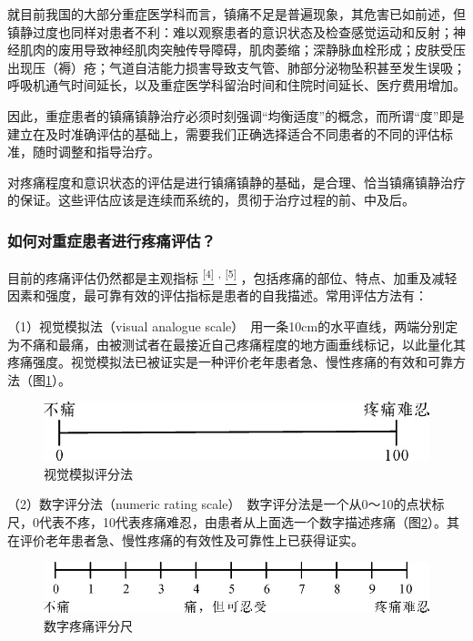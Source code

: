 就目前我国的大部分重症医学科而言，镇痛不足是普遍现象，其危害已如前述，但镇静过度也同样对患者不利：难以观察患者的意识状态及检查感觉运动和反射；神经肌肉的废用导致神经肌肉突触传导障碍，肌肉萎缩；深静脉血栓形成；皮肤受压出现压（褥）疮；气道自洁能力损害导致支气管、肺部分泌物坠积甚至发生误吸；呼吸机通气时间延长，以及重症医学科留治时间和住院时间延长、医疗费用增加。

因此，重症患者的镇痛镇静治疗必须时刻强调“均衡适度”的概念，而所谓“度”即是建立在及时准确评估的基础上，需要我们正确选择适合不同患者的不同的评估标准，随时调整和指导治疗。

对疼痛程度和意识状态的评估是进行镇痛镇静的基础，是合理、恰当镇痛镇静治疗的保证。这些评估应该是连续而系统的，贯彻于治疗过程的前、中及后。

\subsubsection{如何对重症患者进行疼痛评估？}

目前的疼痛评估仍然都是主观指标
\protect\hyperlink{text00027.htmlux5cux23ch4-26}{\textsuperscript{{[}4{]}}}
\textsuperscript{,}
\protect\hyperlink{text00027.htmlux5cux23ch5-26}{\textsuperscript{{[}5{]}}}
，包括疼痛的部位、特点、加重及减轻因素和强度，最可靠有效的评估指标是患者的自我描述。常用评估方法有：

（1）视觉模拟法（visual analogue
scale）　用一条10cm的水平直线，两端分别定为不痛和最痛，由被测试者在最接近自己疼痛程度的地方画垂线标记，以此量化其疼痛强度。视觉模拟法已被证实是一种评价老年患者急、慢性疼痛的有效和可靠方法（图\ref{fig21-1}）。

\begin{figure}[!htbp]
 \centering
 \includegraphics{./images/Image00227.jpg}
 \captionsetup{justification=centering}
 \caption{视觉模拟评分法}
 \label{fig21-1}
  \end{figure} 

（2）数字评分法（numeric rating
scale）　数字评分法是一个从0～10的点状标尺，0代表不疼，10代表疼痛难忍，由患者从上面选一个数字描述疼痛（图\ref{fig21-2}）。其在评价老年患者急、慢性疼痛的有效性及可靠性上已获得证实。

\begin{figure}[!htbp]
 \centering
 \includegraphics{./images/Image00228.jpg}
 \captionsetup{justification=centering}
 \caption{数字疼痛评分尺}
 \label{fig21-2}
  \end{figure} 

